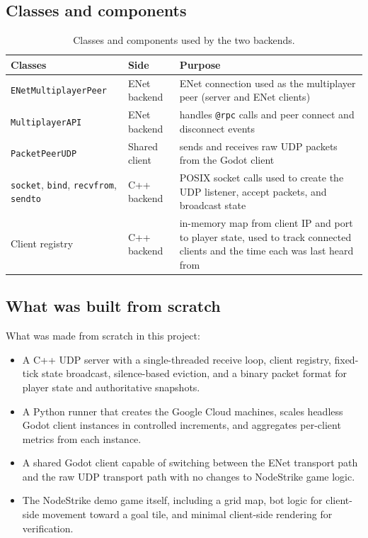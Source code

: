\IfFileExists{IEEEtran.cls}{\ieeetrue\documentclass[conference]{IEEEtran}}{\ieeefalse\documentclass[twocolumn,10pt]{article}}
\begin{document}
\subsection{Classes and components}
\begin{table}[H]
\caption{Classes and components used by the two backends.}
\label{tab:classes}
\centering
\footnotesize
\setlength{\tabcolsep}{3pt}
\begin{tabular}{>{\raggedright\arraybackslash}p{}>{\raggedright\arraybackslash}p{}>{\raggedright\arraybackslash}p{}}
\toprule
Classes & Side & Purpose \\
\midrule
\texttt{ENetMultiplayerPeer} & ENet backend & ENet connection used as the multiplayer peer (server and ENet clients) \\
\texttt{MultiplayerAPI} & ENet backend & handles \texttt{@rpc} calls and peer connect and disconnect events \\
\texttt{PacketPeerUDP} & Shared client & sends and receives raw UDP packets from the Godot client \\
\texttt{socket}, \texttt{bind}, \texttt{recvfrom}, \texttt{sendto} & C++ backend & POSIX socket calls used to create the UDP listener, accept packets, and broadcast state \\
Client registry & C++ backend & in-memory map from client IP and port to player state, used to track connected clients and the time each was last heard from \\
\bottomrule
\end{tabular}
\end{table}

\subsection{What was built from scratch}
What was made from scratch in this project:
\begin{itemize}
\item A C++ UDP server with a single-threaded receive loop, client registry, fixed-tick state broadcast, silence-based eviction, and a binary packet format for player state and authoritative snapshots.
\item A Python runner that creates the Google Cloud machines, scales headless Godot client instances in controlled increments, and aggregates per-client metrics from each instance.
\item A shared Godot client capable of switching between the ENet transport path and the raw UDP transport path with no changes to NodeStrike game logic.
\item The NodeStrike demo game itself, including a grid map, bot logic for client-side movement toward a goal tile, and minimal client-side rendering for verification.
\end{itemize}
\end{document}
